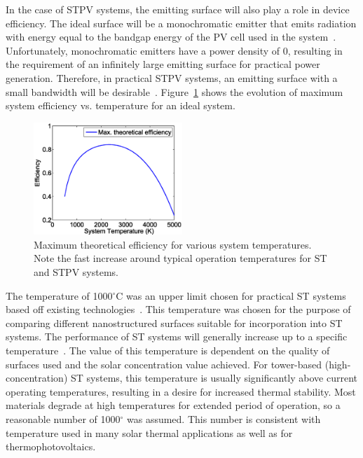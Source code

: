 \documentclass[review]{elsarticle}
\begin{document}
In the case of STPV systems, the emitting 
surface will also play a role in device efficiency.  The ideal
surface will be a monochromatic emitter that emits radiation with energy equal to the 
bandgap energy of the PV cell used in the system~\cite{TheoreticalEfficiency,L_AIP_2007}.  Unfortunately, monochromatic 
emitters have a power density of 0, resulting in the requirement of an infinitely large 
emitting surface for practical power generation.  Therefore, in practical STPV systems, an 
emitting surface with a small bandwidth will be desirable~\cite{RF_OptExp_2009}.  
Figure~\ref{Ideal} 
shows the evolution of maximum system efficiency vs. temperature for an ideal system.
\begin{figure}[ht!]
\begin{center}
        \includegraphics[width=0.5\textwidth]{ideal_STPV_eff}
        \caption{\label{Ideal} Maximum theoretical efficiency for various system temperatures.  Note the fast increase
around typical operation temperatures for ST and STPV systems.}
\end{center}
\end{figure}

The temperature of 1000$^\circ$C was an upper limit chosen for practical ST systems based off existing 
technologies~\cite{RKR_RenEnRev_2013, g2}.  This temperature was chosen for the purpose of comparing different nanostructured 
surfaces suitable for incorporation into ST systems.  The performance of ST systems will generally 
increase up to a specific temperature~\cite{MS_EnConvMan_2012}.  The value of this temperature is dependent on the 
quality of surfaces used and the solar concentration value achieved.  For tower-based (high-concentration) 
ST systems, this temperature is usually significantly above current operating temperatures, resulting in a 
desire for increased thermal stability. Most materials degrade at high temperatures for extended period of 
operation, so a reasonable number of 1000$^{\circ}$ was assumed. This number is consistent with temperature used in 
many solar thermal applications as well as for thermophotovoltaics.
\end{document}
